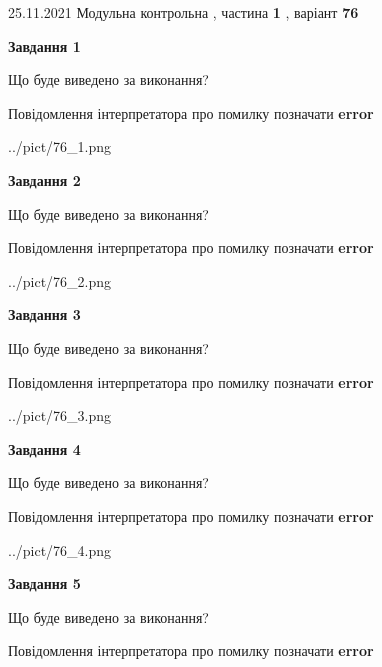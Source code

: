 \documentclass[10pt, ukrainian]{article}
\begin{document}
{25.11.2021 Модульна контрольна , частина \textbf { 1 }, варіант  \No \textbf { 76 }\par}
{
\begin {large}

{\begin {center}\textbf{Завдання 1}\end {center}}\par
Що буде виведено за виконання? \par
Повідомлення інтерпретатора про помилку позначати \textbf{error}

\begin{center}
	{../pict/76_1.png}
\end{center}
\newpage

{\begin {center}\textbf{Завдання 2}\end {center}}\par
Що буде виведено за виконання? \par
Повідомлення інтерпретатора про помилку позначати \textbf{error}

\begin{center}
	{../pict/76_2.png}
\end{center}
\newpage

{\begin {center}\textbf{Завдання 3}\end {center}}\par
Що буде виведено за виконання? \par
Повідомлення інтерпретатора про помилку позначати \textbf{error}

\begin{center}
	{../pict/76_3.png}
\end{center}
\newpage

{\begin {center}\textbf{Завдання 4}\end {center}}\par
Що буде виведено за виконання? \par
Повідомлення інтерпретатора про помилку позначати \textbf{error}

\begin{center}
	{../pict/76_4.png}
\end{center}
\newpage

{\begin {center}\textbf{Завдання 5}\end {center}}\par
Що буде виведено за виконання? \par
Повідомлення інтерпретатора про помилку позначати \textbf{error}


\end{large}}
\end{document}
